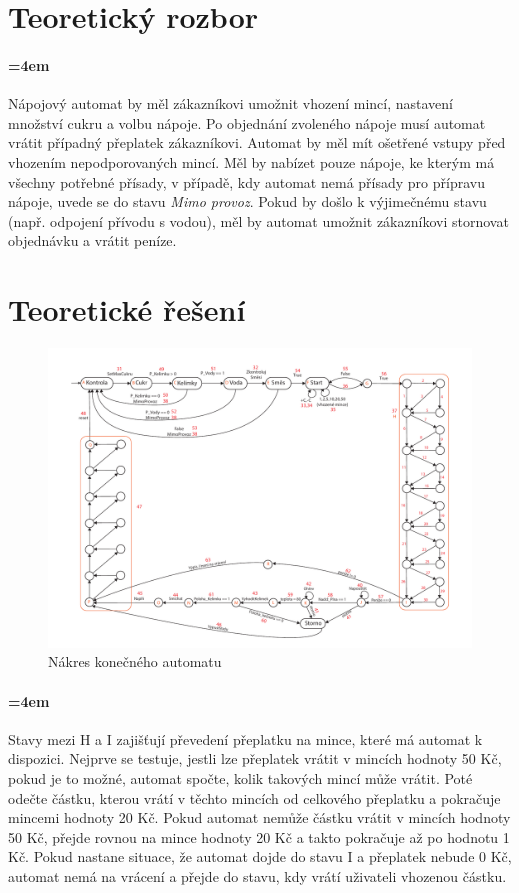 \documentclass[12pt,a4paper]{article}
\begin{document}
\section{Teoretický rozbor}

\paragraph{\parindent=4em}{	
	Nápojový automat by měl zákazníkovi umožnit vhození mincí, nastavení množství cukru a volbu nápoje. Po objednání zvoleného nápoje musí automat vrátit případný přeplatek zákazníkovi. Automat by měl mít ošetřené vstupy před vhozením nepodporovaných mincí. Měl by nabízet pouze nápoje, ke kterým má všechny potřebné přísady, v případě, kdy automat nemá
	přísady pro přípravu nápoje, uvede se do stavu {\it Mimo provoz}. Pokud by došlo k výjimečnému stavu (např. odpojení přívodu s vodou), měl by automat umožnit zákazníkovi stornovat objednávku a vrátit peníze.
}

\newpage
\section{Teoretické řešení}

\begin{figure}[H]	
	\centering
	\includegraphics[angle=-90,width=\textwidth]{doc/kavovar_KA.pdf}
	\caption{Nákres konečného automatu}
\end{figure}
	
\paragraph{\parindent=4em}{	
	Stavy mezi H a I zajišťují převedení přeplatku na mince, které má automat k dispozici. Nejprve se testuje, jestli lze přeplatek vrátit v mincích hodnoty 50 Kč, pokud je to možné, automat spočte, kolik takových mincí může vrátit. Poté odečte částku, kterou vrátí v těchto mincích od celkového přeplatku a pokračuje mincemi hodnoty 20 Kč. Pokud automat nemůže částku vrátit v mincích hodnoty 50 Kč, přejde rovnou na mince hodnoty 20 Kč a takto pokračuje až po hodnotu 1 Kč. Pokud nastane situace, že automat dojde do stavu I a přeplatek nebude 0 Kč, automat nemá na vrácení a přejde do stavu, kdy vrátí uživateli vhozenou částku.
}	
\end{document}
